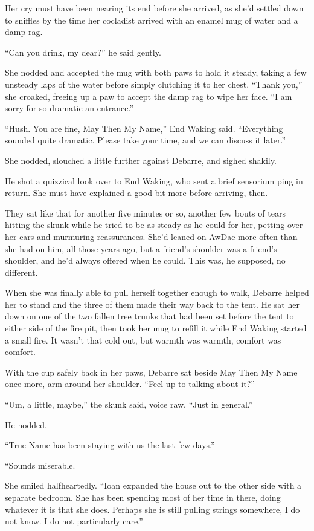Her cry must have been nearing its end before she arrived, as she'd settled down to sniffles by the time her cocladist arrived with an enamel mug of water and a damp rag.

``Can you drink, my dear?'' he said gently.

She nodded and accepted the mug with both paws to hold it steady, taking a few unsteady laps of the water before simply clutching it to her chest. ``Thank you,'' she croaked, freeing up a paw to accept the damp rag to wipe her face. ``I am sorry for so dramatic an entrance.''

``Hush. You are fine, May Then My Name,'' End Waking said. ``Everything sounded quite dramatic. Please take your time, and we can discuss it later.''

She nodded, slouched a little further against Debarre, and sighed shakily.

He shot a quizzical look over to End Waking, who sent a brief sensorium ping in return. She must have explained a good bit more before arriving, then.

They sat like that for another five minutes or so, another few bouts of tears hitting the skunk while he tried to be as steady as he could for her, petting over her ears and murmuring reassurances. She'd leaned on AwDae more often than she had on him, all those years ago, but a friend's shoulder was a friend's shoulder, and he'd always offered when he could. This was, he supposed, no different.

When she was finally able to pull herself together enough to walk, Debarre helped her to stand and the three of them made their way back to the tent. He sat her down on one of the two fallen tree trunks that had been set before the tent to either side of the fire pit, then took her mug to refill it while End Waking started a small fire. It wasn't that cold out, but warmth was warmth, comfort was comfort.

With the cup safely back in her paws, Debarre sat beside May Then My Name once more, arm around her shoulder. ``Feel up to talking about it?''

``Um, a little, maybe,'' the skunk said, voice raw. ``Just in general.''

He nodded.

``True Name has been staying with us the last few days.''

``Sounds miserable.

She smiled halfheartedly. ``Ioan expanded the house out to the other side with a separate bedroom. She has been spending most of her time in there, doing whatever it is that she does. Perhaps she is still pulling strings somewhere, I do not know. I do not particularly care.''


